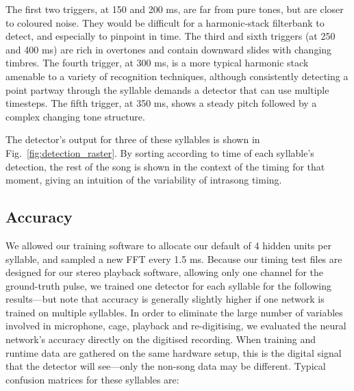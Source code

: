 \documentclass[10pt,letterpaper]{article}
\newcommand\fig[1]{Fig.~\ref{#1}}
\let\oldmarginpar\marginpar
\renewcommand{\marginpar}[1]{\oldmarginpar{\linespread{1}\scriptsize{#1}}}
\begin{document}
The first two triggers, at 150 and 200 ms, are far from pure tones, but are closer to coloured noise.  They would be difficult for a harmonic-stack filterbank to detect, and especially to pinpoint in time.  The third and sixth triggers (at 250 and 400 ms) are rich in overtones and contain downward slides with changing timbres.  The fourth trigger, at 300 ms, is a more typical harmonic stack amenable to a variety of recognition techniques, although consistently detecting a point partway through the syllable demands a detector that can use multiple timesteps.  The fifth trigger, at 350 ms, shows a steady pitch followed by a complex changing tone structure.

The detector's output for three of these syllables is shown in \fig{fig:detection_raster}.   By sorting according to time of each syllable's detection, the rest of the song is shown in the context of the timing for that moment, giving an intuition of the variability of intrasong timing.

\subsection{Accuracy}

We allowed our training software to allocate our default of 4 hidden units per syllable, and sampled a new FFT every 1.5 ms.  Because our timing test files are designed for our stereo playback software, allowing only one channel for the ground-truth pulse, we trained one detector for each syllable for the following results---but note that accuracy is generally slightly higher if one network is trained on multiple syllables.  In order to eliminate the large number of variables involved in microphone, cage, playback and re-digitising, we evaluated the neural network's accuracy directly on the digitised recording.  When training and runtime data are gathered on the same hardware setup, this is the digital signal that the detector will see---only the non-song data may be different.
Typical confusion matrices for these syllables are:
\end{document}
